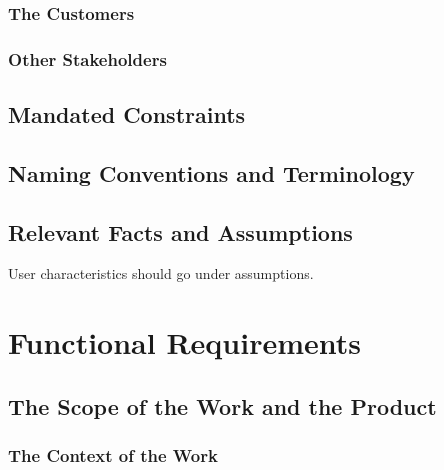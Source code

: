 \documentclass[12pt, titlepage]{article}
\begin{document}
\subsubsection{The Customers}

\subsubsection{Other Stakeholders}

\subsection{Mandated Constraints}

\subsection{Naming Conventions and Terminology}

\subsection{Relevant Facts and Assumptions}

User characteristics should go under assumptions.

\section{Functional Requirements}

\subsection{The Scope of the Work and the Product}

\subsubsection{The Context of the Work}
\end{document}

